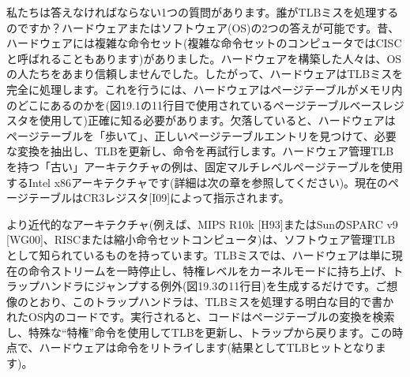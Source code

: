 私たちは答えなければならない1つの質問があります。誰がTLBミスを処理するのですか？ハードウェアまたはソフトウェア(OS)の2つの答えが可能です。昔、ハードウェアには複雑な命令セット(複雑な命令セットのコンピュータではCISCと呼ばれることもあります)がありました。ハードウェアを構築した人々は、OSの人たちをあまり信頼しませんでした。したがって、ハードウェアはTLBミスを完全に処理します。これを行うには、ハードウェアはページテーブルがメモリ内のどこにあるのかを(図19.1の11行目で使用されているページテーブルベースレジスタを使用して)正確に知る必要があります。欠落していると、ハードウェアはページテーブルを「歩いて」、正しいページテーブルエントリを見つけて、必要な変換を抽出し、TLBを更新し、命令を再試行します。ハードウェア管理TLBを持つ「古い」アーキテクチャの例は、固定マルチレベルページテーブルを使用するIntel
x86アーキテクチャです(詳細は次の章を参照してください)。現在のページテーブルはCR3レジスタ{[}I0\hspace{0pt}\hspace{0pt}9{]}によって指示されます。

\begin{Shaded}
\begin{Highlighting}[]
  
\end{Highlighting}
\end{Shaded}

より近代的なアーキテクチャ(例えば、MIPS R10k {[}H93{]}またはSunのSPARC
v9
{[}WG00{]}、RISCまたは縮小命令セットコンピュータ)は、ソフトウェア管理TLBとして知られているものを持っています。TLBミスでは、ハードウェアは単に現在の命令ストリームを一時停止し、特権レベルをカーネルモードに持ち上げ、トラップハンドラにジャンプする例外(図19.3の11行目)を生成するだけです。ご想像のとおり、このトラップハンドラは、TLBミスを処理する明白な目的で書かれたOS内のコードです。実行されると、コードはページテーブルの変換を検索し、特殊な``特権''命令を使用してTLBを更新し、トラップから戻ります。この時点で、ハードウェアは命令をリトライします(結果としてTLBヒットとなります)。

